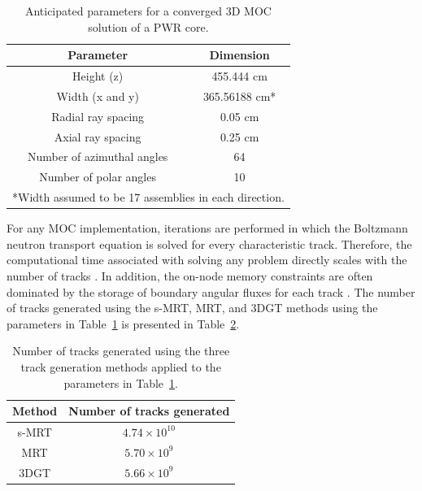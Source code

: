 \begin{table}[h]
	\centering
	\caption{Anticipated parameters for a converged 3D MOC solution of a PWR core.}
	\begin{tabular}{cc}
		\toprule
		\textbf{Parameter} & \textbf{Dimension} \\
		\midrule
		Height (z)                 & 455.444 cm \\
		Width (x and y)            & 365.56188 cm*\\
		Radial ray spacing         & 0.05 cm \\
		Axial ray spacing          & 0.25 cm \\
		Number of azimuthal angles & 64 \\
		Number of polar angles     & 10 \\
		\bottomrule
		\multicolumn{2}{l}{*Width assumed to be 17 assemblies in each direction.}\\
		\bottomrule
	\end{tabular}
	\label{tab:full_core_reqs}
\end{table}

For any MOC implementation, iterations are performed in which the Boltzmann neutron transport equation is solved for every characteristic track. Therefore, the computational time associated with solving any problem directly scales with the number of tracks \cite{kochunas}. In addition, the on-node memory constraints are often dominated by the storage of boundary angular fluxes for each track \cite{gunow}. The number of tracks generated using the s-MRT, MRT, and 3DGT methods using the parameters in Table~\ref{tab:full_core_reqs} is presented in Table~\ref{tab:track_laydown_comparison}. 

\begin{table}[h]
	\centering
	\caption{Number of tracks generated using the three track generation methods applied to the parameters in Table~\ref{tab:full_core_reqs}.}
	\begin{tabular}{cc}
		\toprule
		\textbf{Method} & \textbf{Number of tracks generated} \\
		\midrule
		s-MRT & $4.74 \times 10^{10}$ \\
		MRT & $5.70 \times 10^9$ \\
		3DGT & $5.66 \times 10^9$ \\
		\bottomrule
	\end{tabular}
	\label{tab:track_laydown_comparison}
\end{table}

